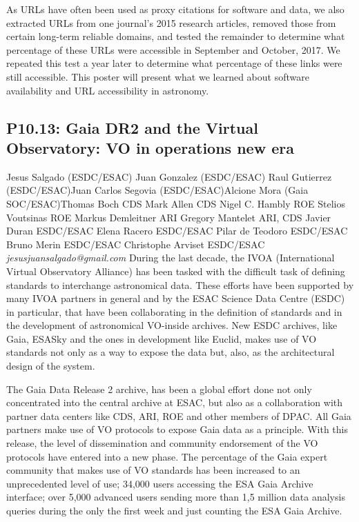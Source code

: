 \documentclass{report}
\begin{document}
As URLs have often been used as proxy citations for software and data, we also extracted URLs from one journal’s 2015 research articles, removed those from certain long-term reliable domains, and tested the remainder to determine what percentage of these URLs were accessible in September and October, 2017. We repeated this test a year later to determine what percentage of these links were still accessible. This poster will present what we learned about software availability and URL accessibility in astronomy.\newline
\newpage
\subsection*{P10.13: Gaia DR2 and the Virtual Observatory: VO in operations new era}
\bigskip
Jesus Salgado (ESDC/ESAC) \newline Juan Gonzalez (ESDC/ESAC) \newline  Raul Gutierrez (ESDC/ESAC)\newline  Juan Carlos Segovia (ESDC/ESAC)\newline Alcione Mora (Gaia SOC/ESAC)\newline  Thomas Boch CDS
Mark Allen CDS
Nigel C. Hambly ROE
Stelios Voutsinas ROE
Markus Demleitner ARI
Gregory Mantelet ARI, CDS
Javier Duran ESDC/ESAC
Elena Racero ESDC/ESAC
Pilar de Teodoro ESDC/ESAC
Bruno Merin ESDC/ESAC
Christophe Arviset ESDC/ESAC\newline\newline
{\it jesusjuansalgado@gmail.com}\newline
\newline\newline
During the last decade, the IVOA (International Virtual Observatory Alliance) has been tasked with the difficult task of defining standards to interchange astronomical data. These efforts have been supported by many IVOA partners in general and by the ESAC Science Data Centre (ESDC) in particular, that have been collaborating in the definition of standards and in the development of astronomical VO-inside archives. New ESDC archives, like Gaia, ESASky and the ones in development like Euclid, makes use of VO standards not only as a way to expose the data but, also, as the architectural design of the system.

The Gaia Data Release 2 archive, has been a global effort done not only concentrated into the central archive at ESAC, but also as a collaboration with partner data centers like CDS, ARI, ROE and other members of DPAC. All Gaia partners make use of VO protocols to expose Gaia data as a principle. With this release, the level of dissemination and community endorsement of the VO protocols have entered into a new phase. The percentage of the Gaia expert community that makes use of VO standards has been increased to an unprecedented level of use;  34,000 users accessing the ESA Gaia Archive interface; over 5,000 advanced users sending more than 1,5 million data analysis queries during the only the first week and just counting the ESA Gaia Archive.
\end{document}

